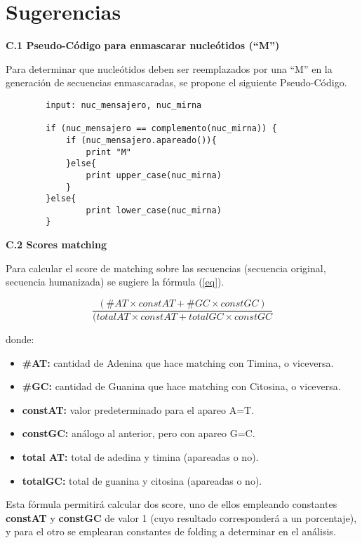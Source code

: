 \section{Sugerencias}
\label{appendix-formulates}

	\large \textbf{C.1 Pseudo-Código para enmascarar nucleótidos (``M'')}
	\par Para determinar que nucleótidos deben ser reemplazados por una ``M'' en la generación de secuencias enmascaradas, 		se propone el siguiente Pseudo-Código.

    \begin{verbatim}
        input: nuc_mensajero, nuc_mirna

        if (nuc_mensajero == complemento(nuc_mirna)) {
            if (nuc_mensajero.apareado()){
                print "M"
            }else{
                print upper_case(nuc_mirna)			
            }	
        }else{
                print lower_case(nuc_mirna)
        }                
    \end{verbatim}

	\large \textbf{C.2 Scores matching}
	\par Para calcular el score de matching sobre las secuencias (secuencia original, secuencia humanizada) se sugiere la 		fórmula (\ref{eq}).

	\begin{equation}	
		\label{eq} \frac{(\#AT \times constAT + \#GC \times constGC)}{(totalAT \times constAT + totalGC \times constGC}
	\end{equation}	

	\par donde:
		\begin{itemize}
			\item \textbf{\#AT:} cantidad de Adenina que hace matching con Timina, o viceversa.
			\item \textbf{\#GC:} cantidad de Guanina que hace matching con Citosina, o viceversa.
			\item \textbf{constAT:} valor predeterminado para el apareo A=T.
			\item \textbf{constGC:} análogo al anterior, pero con apareo G=C.
			\item \textbf{total AT:} total de adedina y timina (apareadas o no).
			\item \textbf{totalGC:} total de guanina y citosina (apareadas o no).	
		\end{itemize} 

	\par Esta fórmula permitirá calcular dos score, uno de ellos empleando constantes \textbf{constAT} y \textbf{constGC} 		de valor 1 (cuyo resultado corresponderá a un porcentaje), y para el otro se emplearan constantes de folding a determinar en el análisis.
 

